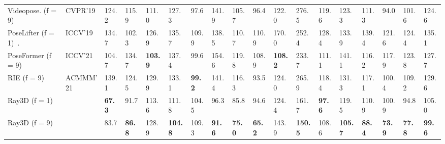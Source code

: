 \documentclass[10pt,twocolumn,letterpaper]{article}
\begin{document}
\begin{table*}[htbp]
\begin{tabular}{@{}l|llllllllllllllll|l@{}}
Videopose. (f = 9) ~\cite{dario2019videopose} &CVPR'19  &124.2 &115.9 &111.0 &127.3  &97.6  &141.9 &105.7 &96.4    &122.0 &276.5  &119.6 &123.3 &111.3  &94.0  &101.6  &124.6   \\
PoseLifter (f = 1)~\cite{ju2019absposelifter}.          &ICCV’19  &134.7 &102.3 &126.9 &135.7  &109.9 &138.5 &110.7 &110.9   &170.0 &252.4  &128.4 &133.9 &139.4  &121.6 &124.4  &135.1   \\
PoseFormer (f = 9) \cite{ce2021poseformer}       &ICCV'21  &104.7 &134.7 &\textbf{103.9} &137.4  &99.6  &154.6 &119.8 &108.9   &\textbf{108.2} &233.7  &111.1 &141.1 &116.2  &117.9 &123.8  &127.7   \\
RIE (f = 9) ~\cite{wenkang2021improving}         &ACMMM'21  &139.1 &124.5 &129.9 &133.1  &\textbf{99.2}  &141.4 &116.3 &93.5    &124.0 &265.9  &118.4 &131.3 & 117.1 &100.4 &109.2  &129.6  \\ \hline
Ray3D (f = 1)                                    &         &\textbf{67.3}  &91.7  &113.6 &111.8  &104.5 &96.3  &85.8  &94.6    &124.4 &161.7  &\textbf{97.6}  &119.5 &110.9  &100.9 &94.8   &105.0\\
Ray3D (f = 9)                                    &         &83.7  &\textbf{86.8}  &128.9 &\textbf{104.8}  &109.3 &\textbf{91.6}  &\textbf{75.0}  &\textbf{65.2}    &143.9 &\textbf{150.5}  &108.6 &\textbf{105.7} &\textbf{88.4}  &\textbf{73.9}  &\textbf{77.8}  &\textbf{99.6} \\ \bottomrule
\end{tabular}
\label{table:2}

\end{table*}
\end{document}
